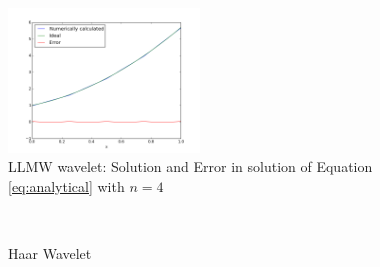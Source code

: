 \documentclass{scrartcl}
\begin{document}
\begin{figure}
        \centering{}
\includegraphics[width=2in]{allmw4.png}
\caption{\label{fig:allmw4}LLMW wavelet: Solution and Error in solution of Equation \ref{eq:analytical} with $n=4$}
\end{figure}
\begin{figure}
\centering
{}
\newline
{}\\
\caption{Haar Wavelet}
\label{fig:haarphipsi}
\end{figure}
\end{document}
